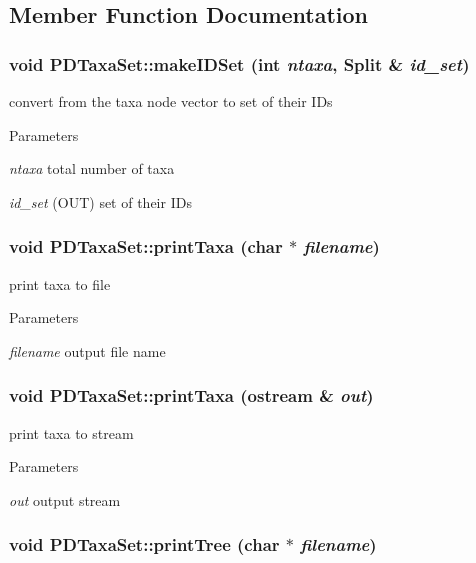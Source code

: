 \subsection{Member Function Documentation}
\hypertarget{classPDTaxaSet_a1d0a17a1df458f812f50def71d399d0b}{
\subsubsection[{makeIDSet}]{\setlength{\rightskip}{0pt plus 5cm}void PDTaxaSet::makeIDSet (int {\em ntaxa}, \/  {\bf Split} \& {\em id\_\-set})}}
\label{classPDTaxaSet_a1d0a17a1df458f812f50def71d399d0b}
convert from the taxa node vector to set of their IDs 
\begin{DoxyParams}{Parameters}
\item[{\em ntaxa}]total number of taxa \item[{\em id\_\-set}](OUT) set of their IDs \end{DoxyParams}
\hypertarget{classPDTaxaSet_ac9d03151ac179718da133ff5032cfcf1}{
\subsubsection[{printTaxa}]{\setlength{\rightskip}{0pt plus 5cm}void PDTaxaSet::printTaxa (char $\ast$ {\em filename})}}
\label{classPDTaxaSet_ac9d03151ac179718da133ff5032cfcf1}
print taxa to file 
\begin{DoxyParams}{Parameters}
\item[{\em filename}]output file name \end{DoxyParams}
\hypertarget{classPDTaxaSet_a077e50e0d00317fd16f49b1e6ec61833}{
\subsubsection[{printTaxa}]{\setlength{\rightskip}{0pt plus 5cm}void PDTaxaSet::printTaxa (ostream \& {\em out})}}
\label{classPDTaxaSet_a077e50e0d00317fd16f49b1e6ec61833}
print taxa to stream 
\begin{DoxyParams}{Parameters}
\item[{\em out}]output stream \end{DoxyParams}
\hypertarget{classPDTaxaSet_a602f719dcbdaccbe9e39c7c984419262}{
\subsubsection[{printTree}]{\setlength{\rightskip}{0pt plus 5cm}void PDTaxaSet::printTree (char $\ast$ {\em filename})}}
